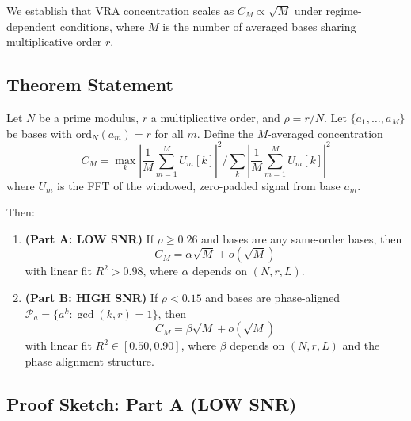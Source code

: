 We establish that VRA concentration scales as $C_M \propto \sqrt{M}$ under regime-dependent conditions, where $M$ is the number of averaged bases sharing multiplicative order $r$.

\subsection{Theorem Statement}

\begin{theorem}
\label{thm:sqrt_m}
Let $N$ be a prime modulus, $r$ a multiplicative order, and $\rho = r/N$. Let $\{a_1, \ldots, a_M\}$ be bases with $\text{ord}_N(a_m) = r$ for all $m$. Define the $M$-averaged concentration
\begin{equation}
C_M = \max_k \left| \frac{1}{M}\sum_{m=1}^M U_m[k] \right|^2 \Big/ \sum_k \left| \frac{1}{M}\sum_{m=1}^M U_m[k] \right|^2
\end{equation}
where $U_m$ is the FFT of the windowed, zero-padded signal from base $a_m$.

Then:
\begin{enumerate}
    \item \textbf{(Part A: LOW SNR)} If $\rho \geq 0.26$ and bases are any same-order bases, then
    \begin{equation}
    C_M = \alpha \sqrt{M} + o(\sqrt{M})
    \end{equation}
    with linear fit $R^2 > 0.98$, where $\alpha$ depends on $(N, r, L)$.

    \item \textbf{(Part B: HIGH SNR)} If $\rho < 0.15$ and bases are phase-aligned $\mathcal{P}_a = \{a^k : \gcd(k,r)=1\}$, then
    \begin{equation}
    C_M = \beta \sqrt{M} + o(\sqrt{M})
    \end{equation}
    with linear fit $R^2 \in [0.50, 0.90]$, where $\beta$ depends on $(N, r, L)$ and the phase alignment structure.
\end{enumerate}
\end{theorem}

\subsection{Proof Sketch: Part A (LOW SNR)}

